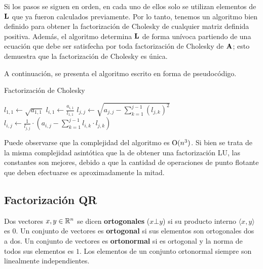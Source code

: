 Si los pasos se siguen en orden, en cada uno de ellos solo se utilizan
elementos de $\mathbf{L}$ que ya fueron calculados previamente. Por lo tanto,
tenemos un algoritmo bien definido para obtener la factorización de Cholesky
de cualquier matriz definida positiva.
Además, el algoritmo determina $\mathbf{L}$ de forma
unívoca partiendo de una ecuación que debe ser satisfecha por toda
factorización de Cholesky de $\mathbf{A}$; esto demuestra que la factorización
de Cholesky es única.

A continuación, se presenta el algoritmo escrito en forma de pseudocódigo.

\begin{algorithm}[H]
\caption{Factorización de Cholesky}
\label{algo:cholesky}


$\displaystyle l_{1,1} \gets \sqrt{a_{1,1}}$\;
 {
    $\displaystyle l_{i,1} \gets \frac{a_{i,1}}{l_{1,1}}$\;
}
 {
    $\displaystyle l_{j,j} \gets \sqrt{a_{j,j} -
        \sum_{k=1}^{j-1} (l_{j,k})^2}$\;
     {
        $\displaystyle l_{i,j} \gets \frac{1}{l_{j,j}} \cdot
        \left( a_{i,j} - \sum_{k=1}^{j-1} l_{i,k} \cdot l_{j,k} \right)$\;
    }
}
\end{algorithm}

Puede observarse que la complejidad del algoritmo es $\mathrm{O}(n^3)$. Si bien
se trata de la misma complejidad asintótica que la de obtener una
factorización LU, las constantes son mejores, debido a que la cantidad de
operaciones de punto flotante que deben efectuarse es aproximadamente la
mitad.


\subsection{Factorización QR}

Dos vectores $x, y \in \mathbb{R}^{n}$ se dicen \textbf{ortogonales} ($x \bot y$)
si su producto interno $\langle x,y \rangle$ es $0$. Un conjunto de vectores
es \textbf{ortogonal} si sus elementos son ortogonales dos a dos. Un conjunto
de vectores es \textbf{ortonormal} si es ortogonal y la norma de todos sus
elementos es $1$. Los elementos de un conjunto ortonormal siempre son
linealmente independientes.

